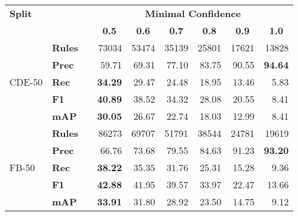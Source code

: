 \begin{tabular}{ l l c r r r r r r }
    \toprule

    \multicolumn{1}{l}{\textbf{Split}} &
    & \phantom &
    \multicolumn{6}{c}{\textbf{Minimal Confidence}} \\

    \cmidrule{4-9}

    &
    &&
    \multicolumn{1}{c}{\textbf{0.5}} &
    \multicolumn{1}{c}{\textbf{0.6}} &
    \multicolumn{1}{c}{\textbf{0.7}} &
    \multicolumn{1}{c}{\textbf{0.8}} &
    \multicolumn{1}{c}{\textbf{0.9}} &
    \multicolumn{1}{c}{\textbf{1.0}} \\

    \midrule

    \multirow{5}{*}{CDE-50}
    & \textbf{Rules} && \num{73034} & \num{53474} & \num{35139} & \num{25801} & \num{17621} & \num{13828} \\

    \addlinespace

    & \textbf{Prec}  && 59.71       & 69.31       & 77.10       & 83.75       & 90.55       & \textbf{94.64}       \\
    & \textbf{Rec}   && \textbf{34.29}       & 29.47       & 24.48       & 18.95       & 13.46       & 5.83        \\
    & \textbf{F1}    && \textbf{40.89}       & 38.52       & 34.32       & 28.08       & 20.55       & 8.41        \\
    & \textbf{mAP}   && \textbf{30.05}       & 26.67       & 22.74       & 18.03       & 12.99       & 8.41        \\

    \midrule

    \multirow{5}{*}{FB-50}
    & \textbf{Rules} && \num{86273} & \num{69707} & \num{51791} & \num{38544} & \num{24781} & \num{19619} \\

    \addlinespace

    & \textbf{Prec}  && 66.76       & 73.68       & 79.55       & 84.63       & 91.23       & \textbf{93.20}       \\
    & \textbf{Rec}   && \textbf{38.22}       & 35.35       & 31.76       & 25.31       & 15.28       & 9.36        \\
    & \textbf{F1}    && \textbf{42.88}       & 41.95       & 39.57       & 33.97       & 22.47       & 13.66       \\
    & \textbf{mAP}   && \textbf{33.91}       & 31.80       & 28.92       & 23.50       & 14.75       & 9.12        \\

    \bottomrule
\end{tabular}

